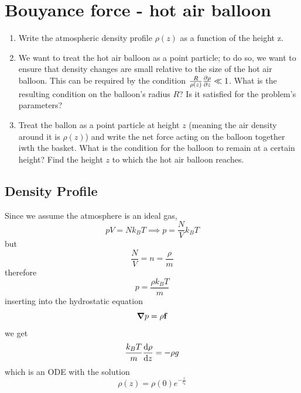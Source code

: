 \clearpage
\section{Bouyance force - hot air balloon}
\begin{colbox}
	\begin{enumerate}
		\item Write the atmospheric density profile \(\rho(z)\) as a function of the height z.
		\item We want to treat the hot air balloon as a point particle; to do so, we want to ensure that density changes are small relative to the size of the hot air balloon. This can be required by the condition \(\frac{R}{\rho(z)}\pdv{\rho}{z}\ll 1\). What is the resulting condition on the balloon's radius \(R\)? Is it satisfied for the problem's parameters?
		\item Treat the ballon as a point particle at height \(z\) (meaning the air density around it is \(\rho(z)\)) and write the net force acting on the balloon together iwth the basket. What is the condition for the balloon to remain at a certain height? Find the height \(z\) to which the hot air balloon reaches.
	\end{enumerate}
\end{colbox}
\subsection{Density Profile}
Since we assume the atmosphere is an ideal gas,
\begin{equation}
	pV = N k_B T \implies p = \frac{N}{V}k_B T
\end{equation}
but
\begin{equation}
	\frac{N}{V} = n = \frac{\rho}{m}
\end{equation}
therefore
\begin{equation}
	p = \frac{\rho k_B T}{m}
\end{equation}
inserting into the hydrostatic equation
\begin{equation}
	\grad{p} = \rho\vb{f}
\end{equation}
we get
\begin{equation}
	\frac{k_B T}{m}\dv{\rho}{z} = -\rho g
\end{equation}
which is an ODE with the solution
\begin{equation}
	\rho(z) = \rho(0) e^{-\frac{z}{l_a}}
\end{equation}
